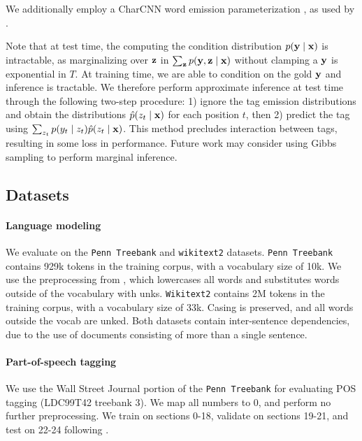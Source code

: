 \documentclass[11pt,a4paper]{article}
\begin{document}
We additionally employ a CharCNN word emission parameterization \citep{kim2015charcnn},
as used by \citet{ma2016crf}.

Note that at test time, the computing the condition distribution $p(\mathbf{y} \mid \mathbf{x})$
is intractable, as marginalizing over $\mathbf{z}$ in $\sum_{\mathbf{z}} p(\mathbf{y}, \mathbf{z} \mid \mathbf{x})$
without clamping a $\mathbf{y}$ is exponential in $T$.
At training time, we are able to condition on the gold $\mathbf{y}$ and inference is tractable.
We therefore perform approximate inference at test time through the following two-step
procedure: 1) ignore the tag emission distributions and obtain the distributions
$\hat{p}(z_t \mid \mathbf{x})$ for each position $t$, then 2) predict the tag using 
$\sum_{z_t} p(y_t \mid z_t)\hat{p}(z_t \mid \mathbf{x})$.
This method precludes interaction between tags, resulting in some loss
in performance. Future work may consider using Gibbs sampling to perform
marginal inference.

\subsection{Datasets}
\paragraph{Language modeling}
We evaluate on the \texttt{Penn Treebank} \citep{ptb}
and \texttt{wikitext2} \citep{wikitext} datasets.
\texttt{Penn Treebank} contains 929k tokens in the training corpus,
with a vocabulary size of 10k.
We use the preprocessing from \citet{mikolov-2011},
which lowercases all words and substitutes words outside of the vocabulary
with unks. 
\texttt{Wikitext2} contains 2M tokens in the training corpus,
with a vocabulary size of 33k.
Casing is preserved, and all words outside the vocab are unked.
Both datasets contain inter-sentence dependencies,
due to the use of documents consisting of more than a single sentence.

\paragraph{Part-of-speech tagging}
We use the Wall Street Journal portion of the \texttt{Penn Treebank}
for evaluating POS tagging (LDC99T42 treebank 3).
We map all numbers to 0, and perform no further preprocessing.
We train on sections 0-18, validate on sections 19-21, and test on 22-24
following \citet{ma2016crf}.
\end{document}

